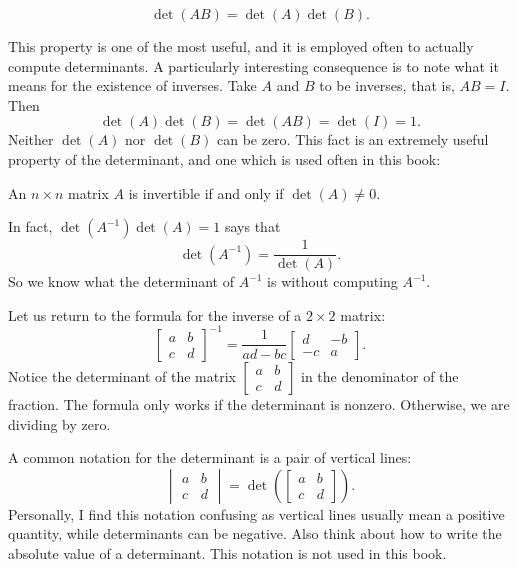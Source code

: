 \begin{theorem}
\begin{equation*}
\det(AB) = \det(A)\det(B) .
\end{equation*}
\end{theorem}

This property is one of the most useful, and it is employed often to
actually compute determinants.  A particularly interesting consequence is to
note what it means for the existence of inverses.
Take $A$ and $B$ to be inverses, that is, $AB=I$.  Then
\begin{equation*}
\det(A)\det(B) = \det(AB) = \det(I) = 1 .
\end{equation*}
Neither $\det(A)$ nor $\det(B)$ can be zero.
This fact is an extremely useful property of the determinant, and one
which is used often in this book:

\begin{theorem}
An $n \times n$ matrix $A$ is invertible if and only if $\det (A) \neq 0$.
\end{theorem}

In fact, $\det(A^{-1}) \det(A) = 1$ says that
\begin{equation*}
\det(A^{-1}) =
\frac{1}{\det(A)}.
\end{equation*}
So we know what the determinant of $A^{-1}$ is
without computing $A^{-1}$.

Let us return to the formula for the inverse of a $2 \times 2$ matrix:
\begin{equation*}
\begin{bmatrix}
a & b \\
c & d
\end{bmatrix}^{-1}
=
\frac{1}{ad-bc}
\begin{bmatrix}
d & -b \\
-c & a
\end{bmatrix} .
\end{equation*}
Notice the determinant of the matrix
$[\begin{smallmatrix}a&b\\c&d\end{smallmatrix}]$
in the denominator of the fraction.
The formula only works if the determinant is nonzero.
Otherwise, we are dividing by zero.

\medskip

A common notation for the determinant is a pair of vertical
lines:
\begin{equation*}
\begin{vmatrix}
a & b \\
c & d
\end{vmatrix}
=
\det \left(
\begin{bmatrix}
a & b \\
c & d
\end{bmatrix}
\right) .
\end{equation*}
Personally, I find this notation confusing as vertical lines usually
mean a positive quantity, while determinants can be negative.  Also
think about how to write the absolute value of a determinant.
This notation is not used in this book.

